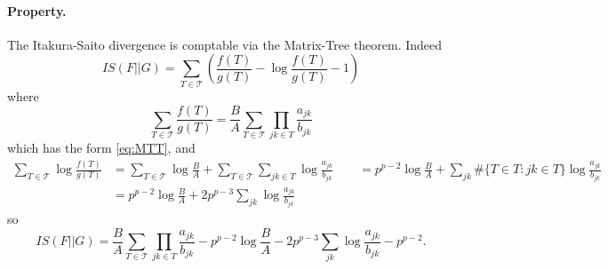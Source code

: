 \documentclass[a4paper, 10pt]{article}
\newcommand{\Tcal}{\mathcal{T}}
\begin{document}
\paragraph{Property.}  The Itakura-Saito divergence is comptable via the Matrix-Tree theorem. Indeed
$$
IS(F || G) 
= \sum_{T \in \Tcal} \left( \frac{f(T)}{g(T)} - \log \frac{f(T)}{g(T)} - 1 \right)
$$
where
$$
\sum_{T \in \Tcal} \frac{f(T)}{g(T)}
= \frac{B}{A} \sum_{T \in \Tcal}  \prod_{jk \in T} \frac{a_{jk}}{b_{jk}}
$$
which has the form \eqref{eq:MTT}, and
\begin{align*}
 \sum_{T \in \Tcal} \log \frac{f(T)}{g(T)} 
 & = \sum_{T \in \Tcal} \log \frac{B}{A} + \sum_{T \in \Tcal} \sum_{jk \in T} \log \frac{a_{jk}}{b_{jk}} 
 \qquad = p^{p-2} \log \frac{B}{A} + \sum_{jk} \#\{T \in T: jk \in T\} \log \frac{a_{jk}}{b_{jk}}  \\
 & = p^{p-2} \log \frac{B}{A} + 2p^{p-3}\sum_{jk} \log \frac{a_{jk}}{b_{jk}} 
\end{align*}
so
$$
IS(F || G) 
= \frac{B}{A} \sum_{T \in \Tcal} \prod_{jk \in T} \frac{a_{jk}}{b_{jk}} 
- p^{p-2} \log \frac{B}{A} - 2p^{p-3}\sum_{jk} \log \frac{a_{jk}}{b_{jk}}
- p^{p-2}.
$$





\end{document}
